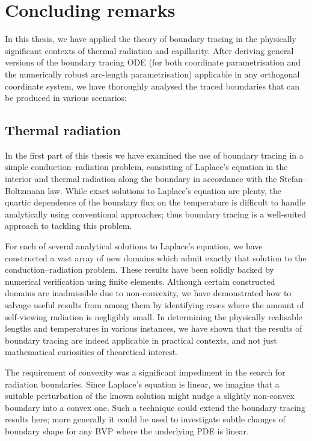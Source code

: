 \chapter{Concluding remarks}
\label{ch:concluding}

In this thesis,
we have applied the theory of boundary tracing
in the physically significant contexts
of thermal radiation and capillarity.
After deriving general versions of the boundary tracing ODE
(for both coordinate parametrisation
and the numerically robust arc-length parametrisation)
applicable in any orthogonal coordinate system,
we have thoroughly analysed
the traced boundaries that can be produced in various scenarios:

\section{Thermal radiation}
\label{sec:concluding.radiation}

In the first part of this thesis we have examined the use of boundary tracing
in a simple conduction--radiation problem,
consisting of Laplace's equation in the interior
and thermal radiation along the boundary
in accordance with the Stefan--Boltzmann law.
While exact solutions to Laplace's equation are plenty,
the quartic dependence of the boundary flux on the temperature
is difficult to handle analytically using conventional approaches;
thus boundary tracing is a well-suited approach to tackling this problem.

For each of several analytical solutions to Laplace's equation,
we have constructed a vast array of new domains
which admit exactly that solution
to the conduction--radiation problem.
These results have been solidly backed
by numerical verification using finite elements.
Although certain constructed domains are inadmissible
due to non-convexity,
we have demonstrated how to salvage useful results from among them
by identifying cases
where the amount of self-viewing radiation is negligibly small.
In determining the physically realisable lengths and temperatures
in various instances,
we have shown that the results of boundary tracing
are indeed applicable in practical contexts,
and not just mathematical curiosities of theoretical interest.

The requirement of convexity was a significant impediment
in the search for radiation boundaries.
Since Laplace's equation is linear,
we imagine that a suitable perturbation of the known solution
might nudge a slightly non-convex boundary
into a convex one.
Such a technique could extend the boundary tracing results here;
more generally it could be used to investigate
subtle changes of boundary shape
for any BVP where the underlying PDE is linear.


